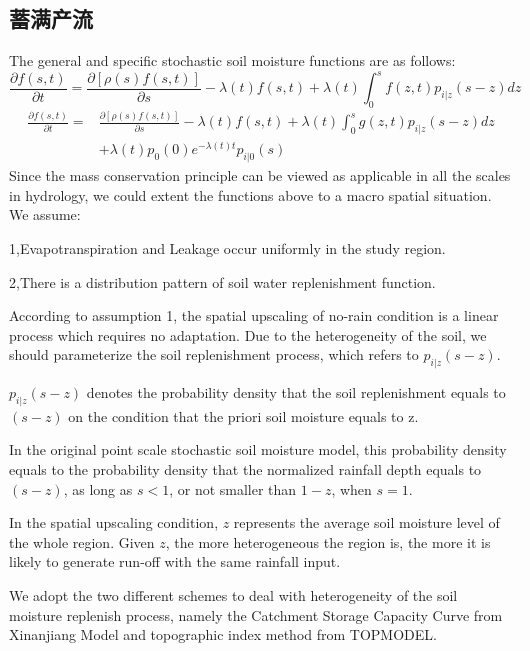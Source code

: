 \subsection{蓄满产流}
The general and specific stochastic soil moisture functions are as follows:
\begin{equation}
\frac{\partial{f(s,t)}}{\partial t}=\frac{\partial{[\rho(s)f(s,t)]}}{\partial s}-\lambda(t)f(s,t)+\lambda(t)\int_{0}^{s} f(z,t)p_{i|z}(s-z)dz
\end{equation}
\begin{equation}
 \begin{split}
 \frac{\partial{f(s,t)}}{\partial t}=&\frac{\partial{[\rho(s)f(s,t)]}}{\partial s}-\lambda(t)f(s,t)+\lambda(t)\int_{0}^{s} g(z,t)p_{i|z}(s-z)dz\\&+\lambda(t)p_0(0)e^{-\lambda(t) t}p_{i|0}(s)
 \end{split}
 \end{equation}
Since the mass conservation principle can be viewed as applicable in all the scales in hydrology, we could extent the functions above to a macro spatial situation. 
We assume:


1,Evapotranspiration and Leakage occur uniformly in the study region.

2,There is a distribution pattern of soil water replenishment function.



According to assumption 1, the spatial upscaling of no-rain condition is a linear process which requires no adaptation.
Due to the heterogeneity of the soil, we should parameterize the soil replenishment process, which refers to $p_{i|z}(s-z)$.

$p_{i|z}(s-z)$ denotes the probability density that the soil replenishment equals to $(s-z)$ on the condition that the priori soil moisture equals to z.
 
In the original point scale stochastic soil moisture model, this probability density equals to the probability density that the normalized rainfall depth equals to $(s-z)$, as long as $s<1$, or not smaller than $1-z$, when $s=1$.  

In the spatial upscaling condition, $z$ represents the average soil moisture level of the whole region. Given $z$, the more heterogeneous the region is, the more it is likely to generate run-off with the same rainfall input. 

We adopt the two different schemes to deal with heterogeneity of the soil moisture replenish process, namely the Catchment Storage Capacity Curve from Xinanjiang Model and topographic index method from TOPMODEL.


